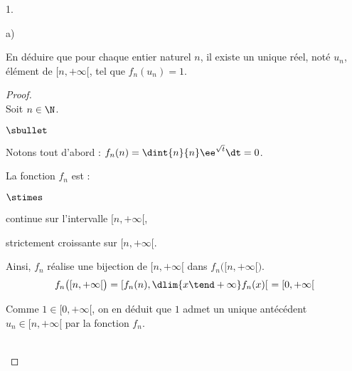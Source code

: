 \documentclass[11pt]{article}%
\begin{document}
\begin{noliste}{1.}
\begin{noliste}{a)}
  \item En déduire que pour chaque entier naturel $n$, il existe un
    unique réel, noté $u_n$, élément de $[n, + \infty[$, tel que
    $f_{n}(u_n) = 1$.

    \begin{proof}~\\
      Soit $n \in \N$.
      \begin{noliste}{$\sbullet$}
      \item Notons tout d'abord : $f_n(n) = \dint{n}{n}
        \ee^{\sqrt{t}}\dt = 0$.

      \item La fonction $f_n$ est :
        \begin{noliste}{$\stimes$}
        \item continue sur l'intervalle $[n,+\infty[$,
        \item strictement croissante sur $[n,+\infty[$.
        \end{noliste}
        Ainsi, $f_n$ réalise une bijection de $[n,+\infty[$ dans
        $f_n\big([n,+\infty[\big)$.
        \[
        f_n\big([n,+\infty[\big) = [f_n(n), \dlim{x \tend +\infty}
        f_n(x) [ \ = [0, +\infty[
        \]

      \item Comme $1 \in [0, +\infty[$, on en déduit que $1$ admet un
        unique antécédent $u_n \in [n, +\infty[$ par la fonction
        $f_n$.
      \end{noliste}
      \conc{Ainsi, il existe un unique réel $u_n\in[n,+\infty[$ tel
        que $f_n(u_n) = 1$.}~\\[-1.2cm]
    \end{proof}
  \end{noliste}


\end{noliste}
\end{document}
